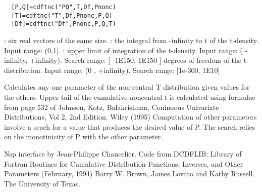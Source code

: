 \begin{mandesc}
\end{mandesc}
\label{cdftnc}
\begin{calling_sequence}
\begin{verbatim}
  [P,Q]=cdftnc("PQ",T,Df,Pnonc)  
  [T]=cdftnc("T",Df,Pnonc,P,Q)  
  [Df]=cdftnc("Df",Pnonc,P,Q,T)  
\end{verbatim}
\end{calling_sequence}
\begin{parameters}
  \begin{varlist}
    : six real vectors of the same size.
    : the integral from -infinity to t of the t-density. Input range: (0,1].
      : upper limit of integration of the t-density. Input range: ( -infinity, +infinity). Search range: [ -1E150, 1E150 ]
       degrees of freedom of the t-distribution. Input range: (0 , +infinity). Search range: [1e-300, 1E10]
  \end{varlist}
\end{parameters}
\begin{mandescription}
  Calculates any one parameter of the non-central T distribution given
  values for the others.
  Upper tail    of  the  cumulative  noncentral t is calculated using 
  formulae  from page 532  of Johnson, Kotz,  Balakrishnan, Coninuous 
  Univariate Distributions, Vol 2, 2nd Edition.  Wiley (1995) 
  Computation of other parameters involve a seach for a value that 
  produces  the desired  value  of P.   The search relies  on  the 
  monotinicity of P with the other parameter. 
\end{mandescription}

\begin{authors}
  Nsp interface by Jean-Philippe Chancelier. Code from DCDFLIB: 
  Library of Fortran Routines for Cumulative Distribution
  Functions, Inverses, and Other Parameters (February, 1994)
  Barry W. Brown, James Lovato and Kathy Russell. The University of Texas.
\end{authors}
